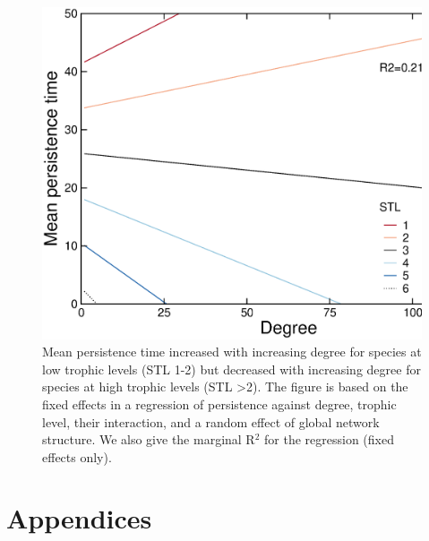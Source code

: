 \documentclass[12pt]{article}
\begin{document}
    \begin{figure}[ht!]
        \centering
        \includegraphics[width=\textwidth]{figures/roles/persistence_vs_degTL.eps}
        \caption{Mean persistence time increased with increasing degree for species at low trophic levels (STL 1-2) but decreased with increasing degree for species at high trophic levels (STL \textgreater2). The figure is based on the fixed effects in a regression of persistence against degree, trophic level, their interaction, and a random effect of global network structure. We also give the marginal R$^2$ for the regression (fixed effects only).}
        \label{fig:persistence_degTL}
    \end{figure}

\clearpage

\section*{Appendices}
\end{document}

